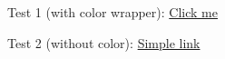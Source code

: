 \documentclass[12pt]{article}
\begin{document}
Test 1 (with color wrapper): \href{https://translate.google.com/?sl=ar&tl=de&text=salam}{Click me}

Test 2 (without color): \href{https://translate.google.com/?sl=ar&tl=de&text=salam}{Simple link}
\end{document}

